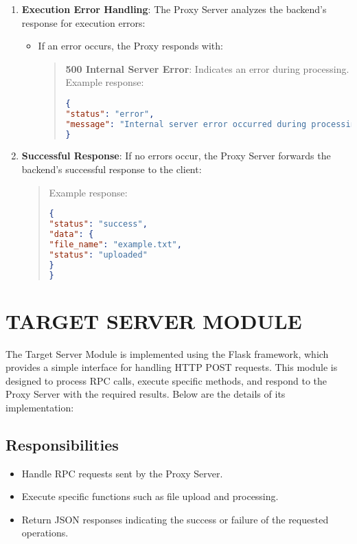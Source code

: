 \documentclass{article}
\begin{document}
\begin{enumerate}
\item \textbf{Execution Error Handling}:
The Proxy Server analyzes the backend's response for execution errors:
\begin{itemize}
\item If an error occurs, the Proxy responds with:
\begin{quote}
\textbf{500 Internal Server Error}: Indicates an error during processing.
Example response:
\begin{lstlisting}[language=JSON]
{
"status": "error",
"message": "Internal server error occurred during processing."
}
\end{lstlisting}
\end{quote}
\end{itemize}

\item \textbf{Successful Response}:
If no errors occur, the Proxy Server forwards the backend's successful response to the client:
\begin{quote}
Example response:
\begin{lstlisting}[language=JSON]
{
"status": "success",
"data": {
"file_name": "example.txt",
"status": "uploaded"
}
}
\end{lstlisting}
\end{quote}
\end{enumerate}


\section{TARGET SERVER MODULE} %
The Target Server Module is implemented using the Flask framework, which provides a simple interface for handling HTTP POST requests. This module is designed to process RPC calls, execute specific methods, and respond to the Proxy Server with the required results. Below are the details of its implementation:

\subsection{Responsibilities}
\begin{itemize}
    \item Handle RPC requests sent by the Proxy Server.
    \item Execute specific functions such as file upload and processing.
    \item Return JSON responses indicating the success or failure of the requested operations.
\end{itemize}
\end{document}
